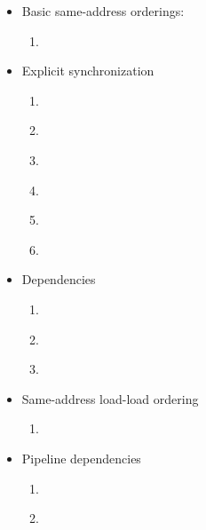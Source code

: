 \begin{itemize}
  \item Basic same-address orderings:
    \begin{enumerate}
      \item\label{ppo:->st} \ppost
    \end{enumerate}
  \item Explicit synchronization
    \begin{enumerate}[resume]
      \item\label{ppo:fence} \ppofence
      \item\label{ppo:acquire} \ppoacquire
      \item\label{ppo:release} \pporelease
      \item\label{ppo:strongacqrel} \ppostrongacqrel
      \item\label{ppo:amostore} \ppoamostore
      \item\label{ppo:amoload} \ppoamoload
    \end{enumerate}
  \item Dependencies
    \begin{enumerate}[resume]
      \item\label{ppo:addr} \ppoaddr
      \item\label{ppo:data} \ppodata
      \item\label{ppo:ctrl} \ppoctrl
    \end{enumerate}
  \item Same-address load-load ordering
    \begin{enumerate}[resume]
      \item\label{ppo:rdw} \ppordw
    \end{enumerate}
  \item Pipeline dependencies
    \begin{enumerate}[resume]
      \item\label{ppo:ld->st->ld} \ppoldstld
      \item\label{ppo:addrpo} \ppoaddrpo
    \end{enumerate}
\end{itemize}

